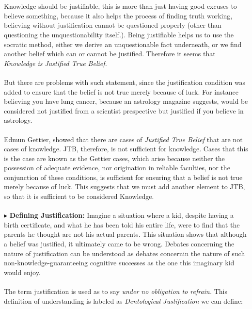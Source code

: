 \documentclass[9pt,a4paper,twocolumn]{article}
\newcounter{def}
\newcommand{\newpoint}[1]{\indent$\blacktriangleright$ \textbf{#1}}
\begin{document}
                \\
                \\
                Knowledge should be justifiable, this is more than just having good excuses to believe something, because it also helps the process of finding truth working, believing without justification cannot be questioned properly (other than questioning the unquestionability itself.). Being justifiable helps us to use the socratic method, either we derive an unquestionable fact underneath, or we find another belief which can or cannot be justified. Therefore it seems that \textit{Knowledge is Justified True Belief.}
                \\
                \\
                But there are problems with such statement, since the justification condition was added to ensure that the belief is not true merely because of luck. For instance believing you have lung cancer, because an astrology magazine suggests, would be considered not justified from a scientist prespective but justified if you believe in astrology.
                \\
                \\
                Edmun Gettier, showed that there are cases of \textit{Justified True Belief} that are not cases of knowledge. JTB, therefore, is not sufficient for knowledge. Cases that this is the case are known as the Gettier cases, which arise because neither the possession of adequate evidence, nor origination in reliable faculties, nor the conjunction of these conditions, is sufficient for ensuring that a belief is not true merely because of luck. This suggests that we must add another element to JTB, so that it is sufficient to be considered Knowledge.\cite{sep-epistemology}
                \\
                \\
                \newpoint{Defining Justification:}
                Imagine a situation where a kid, despite having a birth certificate, and what he has been told his entire life, were to find that the parents he thought are not his actual parents. This situation shows that although a belief was justified, it ultimately came to be wrong. Debates concerning the nature of justification can be understood as debates concernin the nature of such non-knowledge-guaranteeing cognitive successes as the one this imaginary kid would enjoy.
                \\
                \\
                The term justification is used as to say \textit{under no obligation to refrain.} This definition of understanding is labeled as \textit{Dentological Justification} we can define:
\end{document}
